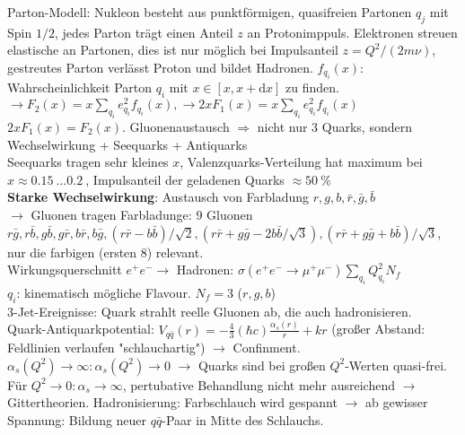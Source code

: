 \documentclass[9pt, landscape,a4paper]{extarticle}
\renewcommand\d{\mathrm{d}}
\begin{document}
\begin{multicols*}{3}
Parton-Modell:
Nukleon besteht aus punktförmigen, quasifreien Partonen $q_j$ mit Spin $1/2$, jedes	Parton trägt einen Anteil $z$ an Protonimppuls.
Elektronen streuen elastische an Partonen, dies ist nur möglich bei	Impulsanteil $z = Q^2 / (2mν)$, gestreutes Parton verlässt Proton und bildet Hadronen.
$f_{q_i}(x):$ Wahrscheinlichkeit Parton $q_i$ mit $x ∈ [x, x + \d x]$ zu finden. \\
$\to F_2(x) = x \sum_{q_i} e^2_{q_i} f_{q_i}(x), \to 2x F_1(x) = x \sum_{q_i} e^2_{q_i} f_{q_i}(x)$ \\
$2 x F_1(x) = F_2(x)$. Gluonenaustausch $⇒$ nicht nur 3 Quarks, sondern Wechselwirkung + Seequarks + Antiquarks \\
Seequarks tragen sehr kleines $x$, Valenzquarks-Verteilung hat maximum bei $x \approx \SI{0.15}{} \dots \SI{0.2}{}$, Impulsanteil der geladenen Quarks $\approx \SI{50}{\percent}$ \\

\textbf{Starke Wechselwirkung}: Austausch von Farbladung $r, g, b, \bar r, \bar g, \bar b$ \\
$\to$ Gluonen tragen Farbladunge: $9$ Gluonen $r \bar g, r \bar b, g \bar b, g \bar r, b \bar r, b \bar g, (r \bar r - b \bar b)/\sqrt{2}, (r \bar r + g \bar g - 2 b \bar b/\sqrt{3}), (r \bar r + g \bar g + b \bar b) / \sqrt{3}$, nur die farbigen (ersten $8$) relevant. \\

Wirkungsquerschnitt $e^{+} e^{-} \to$ Hadronen: $σ(e^{ +} e^{-} \to μ^{ +} μ^{-}) \sum_{q_i} Q^2_{q_i} N_f$ \\
$q_i$: kinematisch mögliche Flavour. $N_f = 3$ ($r,g,b$) \\
3-Jet-Ereignisse: Quark strahlt reelle Gluonen ab, die auch hadronisieren. \\
Quark-Antiquarkpotential: $V_{q \bar q}(r) = - \frac{4}{3}(\hbar c) \frac{α_s(r)}{r} + k r$ (großer Abstand: Feldlinien verlaufen "schlauchartig") $\to$ Confinment. \\
$α_s(Q^2) \to ∞: α_s(Q^2) \to 0$ $\to$ Quarks sind bei großen $Q^2$-Werten quasi-frei. Für $Q^2 \to 0: α_s \to ∞$, pertubative Behandlung nicht mehr ausreichend $\to$ Gittertheorien.
Hadronisierung: Farbschlauch wird gespannt $\to$ ab gewisser Spannung: Bildung neuer $q \bar q$-Paar in Mitte des Schlauchs. \\


\end{multicols*}
\end{document}
